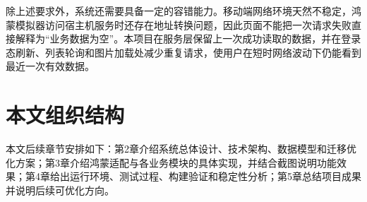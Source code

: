 除上述要求外，系统还需要具备一定的容错能力。移动端网络环境天然不稳定，鸿蒙模拟器访问宿主机服务时还存在地址转换问题，因此页面不能把一次请求失败直接解释为“业务数据为空”。本项目在服务层保留上一次成功读取的数据，并在登录态刷新、列表轮询和图片加载处减少重复请求，使用户在短时网络波动下仍能看到最近一次有效数据。

\section{本文组织结构}

本文后续章节安排如下：第2章介绍系统总体设计、技术架构、数据模型和迁移优化方案；第3章介绍鸿蒙适配与各业务模块的具体实现，并结合截图说明功能效果；第4章给出运行环境、测试过程、构建验证和稳定性分析；第5章总结项目成果并说明后续可优化方向。
